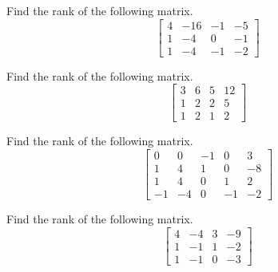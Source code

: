 \documentclass{ximera}
\begin{document}
\begin{problem}\label{prb:2.44} Find the rank of the following matrix.
\begin{equation*}
\left[
\begin{array}{rrrr}
4 & -16 & -1 & -5 \\
1 & -4 & 0 & -1 \\
1 & -4 & -1 & -2
\end{array}
\right]
\end{equation*}
\end{problem}

\begin{problem}\label{prb:2.45} Find the rank of the following matrix.
\begin{equation*}
\left[
\begin{array}{rrrr}
3 & 6 & 5 & 12 \\
1 & 2 & 2 & 5 \\
1 & 2 & 1 & 2
\end{array}
\right]
\end{equation*}
\end{problem}

\begin{problem}\label{prb:2.46} Find the rank of the following matrix.
\begin{equation*}
\left[
\begin{array}{rrrrr}
0 & 0 & -1 & 0 & 3 \\
1 & 4 & 1 & 0 & -8 \\
1 & 4 & 0 & 1 & 2 \\
-1 & -4 & 0 & -1 & -2
\end{array}
\right]
\end{equation*}
\end{problem}

\begin{problem}\label{prb:2.47} Find the rank of the following matrix.
\begin{equation*}
\left[
\begin{array}{rrrr}
4 & -4 & 3 & -9 \\
1 & -1 & 1 & -2 \\
1 & -1 & 0 & -3
\end{array}
\right]
\end{equation*}
\end{problem}
\end{document}
